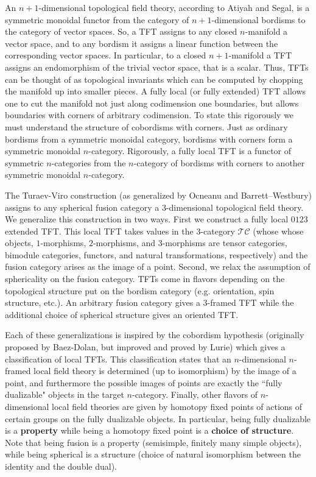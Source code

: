 \documentclass{amsart}
\begin{document}

An $n+1$-dimensional topological field theory, according to Atiyah and Segal, is a symmetric monoidal functor from the category of $n+1$-dimensional bordisms to the category of vector spaces.  So, a TFT assigns to any closed $n$-manifold a vector space, and to any bordism it assigns a linear function between the corresponding vector spaces.  In particular, to a closed $n+1$-manifold a TFT assigns an endomorphism of the trivial vector space, that is a scalar.  Thus, TFTs can be thought of as topological invariants which can be computed by chopping the manifold up into smaller pieces.  A fully local (or fully extended) TFT allows one to cut the manifold not just along codimension one boundaries, but allows boundaries with corners of arbitrary codimension.  To state this rigorously we must understand the structure of cobordisms with corners.  Just as ordinary bordisms from a symmetric monoidal category, bordisms with corners  form a symmetric monoidal $n$-category.  Rigorously, a fully local TFT is a functor of symmetric $n$-categories from the $n$-category of bordisms with corners to another symmetric monoidal $n$-category.  

The Turaev-Viro construction (as generalized by Ocneanu and Barrett--Westbury) assigns to any spherical fusion category a 3-dimensional topological field theory.  We generalize this construction in two ways.  First we construct a fully local $0123$ extended TFT.  This local TFT takes values in the $3$-category $\mathcal{TC}$ (whose whose objects, $1$-morphisms, $2$-morphisms, and $3$-morphisms are tensor categories, bimodule categories, functors, and natural transformations, respectively) and the fusion category arises as the image of a point.  Second, we relax the assumption of sphericality on the fusion category.  TFTs come in flavors depending on the topological structure put on the bordism category (e.g. orientation, spin structure, etc.).  An arbitrary fusion category gives a $3$-framed TFT while the additional choice of spherical structure gives an oriented TFT.

Each of these generalizations is inspired by the cobordism hypothesis (originally proposed by Baez-Dolan, but improved and proved by Lurie) which gives a classification of local TFTs.  This classification states that an $n$-dimensional $n$-framed local field theory is determined (up to isomorphism) by the image of a point, and furthermore the possible images of points are exactly the ``fully dualizable" objects in the target $n$-category.  Finally, other flavors of $n$-dimensional local field theories are given by homotopy fixed points of actions of certain groups on the fully dualizable objects.  In particular, being fully dualizable is a {\bf property} while being a homotopy fixed point is a {\bf choice of structure}.  Note that being fusion is a property (semisimple, finitely many simple objects), while being spherical is a structure (choice of natural isomorphism between the identity and the double dual).
\end{document}
